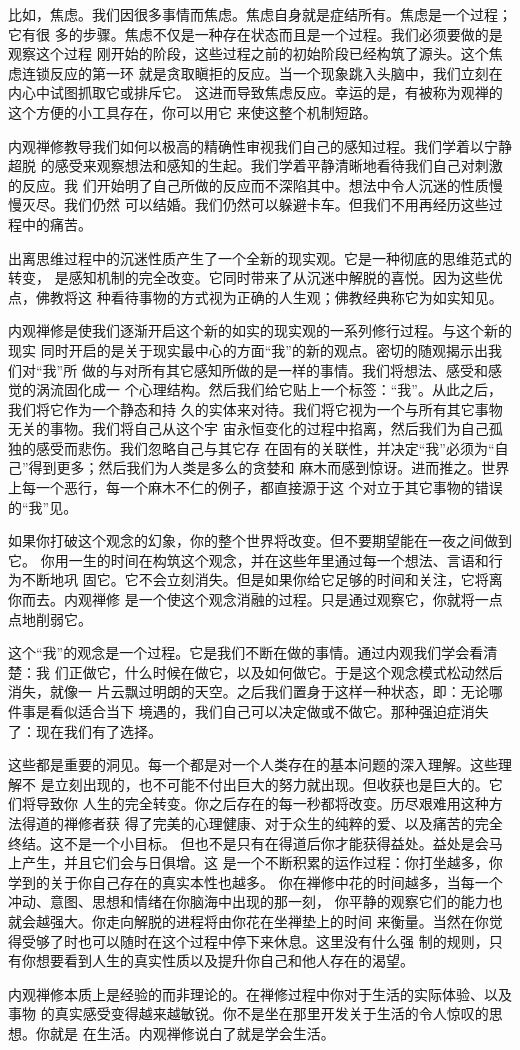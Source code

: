 比如，焦虑。我们因很多事情而焦虑。焦虑自身就是症结所有。焦虑是一个过程；它有很
多的步骤。焦虑不仅是一种存在状态而且是一个过程。我们必须要做的是观察这个过程
刚开始的阶段，这些过程之前的初始阶段已经构筑了源头。这个焦虑连锁反应的第一环
就是贪取瞋拒的反应。当一个现象跳入头脑中，我们立刻在内心中试图抓取它或排斥它。
这进而导致焦虑反应。幸运的是，有被称为观禅的这个方便的小工具存在，你可以用它
来使这整个机制短路。

内观禅修教导我们如何以极高的精确性审视我们自己的感知过程。我们学着以宁静超脱
的感受来观察想法和感知的生起。我们学着平静清晰地看待我们自己对刺激的反应。我
们开始明了自己所做的反应而不深陷其中。想法中令人沉迷的性质慢慢\1灭尽。我们仍然
可以结婚。我们仍然可以躲避卡车。但我们不用再经历这些过程中的痛苦。

出离思维过程中的沉迷性质产生了一个全新的现实观。它是一种彻底的思维范式的转变，
是感知机制的完全改变。它同时带来了从沉迷中解脱的喜悦。因为这些优点，佛教将这
种看待事物的方式视为正确的人生观；佛教经典称它为如实知见。

内观禅修是使我们逐渐开启这个新的如实的现实观的一系列修行过程。与这个新的现实
同时开启的是关于现实最中心的方面“我”的新的观点。密切的随观揭示出我们对“我”所
做的与对所有其它感知所做的是一样的事情。我们将想法、感受和感觉的涡流固化成一
个心理结构。然后我们给它贴上一个标签：“我”。从此之后，我们将它作为一个静态和持
久的实体来对待。我们将它视为一个与所有其它事物无关的事物。我们将自己从这个宇
宙永恒变化的过程中掐离，然后我们为自己孤独的感受而悲伤。我们忽略自己与其它存
在固有的关联性，并决定“我”必须为“自己”得到更多；然后我们为人类是多么的贪婪和
麻木而感到惊讶。进而推之。世界上每一个恶行，每一个麻木不仁的例子，都直接源于这
个对立于其它事物的错误的“我”见。

如果你打破这个观念的幻象，你的整个世界将改变。但不要期望能在一夜之间做到它。
你用一生的时间在构筑这个观念，并在这些年里通过每一个想法、言语和行为不断地巩
固它。它不会立刻消失。但是如果你给它足够的时间和关注，它将离你而去。内观禅修
是一个使这个观念消融的过程。只是通过观察它，你就将一点点地削弱它。\1

这个“我”的观念是一个过程。它是我们不断在做的事情。通过内观我们学会看清楚：我
们正做它，什么时候在做它，以及如何做它。于是这个观念模式松动然后消失，就像一
片云飘过明朗的天空。之后我们置身于这样一种状态，即：无论哪件事是看似适合当下
境遇的，我们自己可以决定做或不做它。那种强迫症消失了：现在我们有了选择。

这些都是重要的洞见。每一个都是对一个人类存在的基本问题的深入理解。这些理解不
是立刻出现的，也不可能不付出巨大的努力就出现。但收获也是巨大的。它们将导致你
人生的完全转变。你之后存在的每一秒都将改变。历尽艰难用这种方法得道的禅修者获
得了完美的心理健康、对于众生的纯粹的爱、以及痛苦的完全终结。这不是一个小目标。
但也不是只有在得道后你才能获得益处。益处是会马上产生，并且它们会与日俱增。这
是一个不断积累的运作过程：你打坐越多，你学到的关于你自己存在的真实本性也越多。
你在禅修中花的时间越多，当每一个冲动、意图、思想和情绪在你脑海中出现的那一刻，
你平静的观察它们的能力也就会越强大。你走向解脱的进程将由你花在坐禅垫上的时间
来衡量。当然在你觉得受够了时也可以随时在这个过程中停下来休息。这里没有什么强
制的规则，只有你想要看到人生的真实性质以及提升你自己和他人存在的渴望。

内观禅修本质上是经验的而非理论的。在禅修过程中你对于生活的实际体验、以及事物
的真实感受变得越来越敏锐。你不是坐在那里开发关于生活的令人惊叹的思想。你就是
在生活。内观禅修说白了就是学会生活。

\endchapter

\byebye
